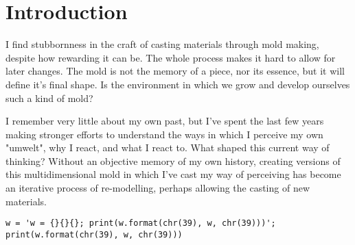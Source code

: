 
\chapter*{Introduction}



I find stubbornness in the craft of casting materials through mold making, despite how rewarding it can be. The whole process makes it hard to allow for later changes. The mold is not the memory of a piece, nor its essence, but it will define it's final shape. Is the environment in which we grow and develop ourselves such a kind of mold? 

I remember very little about my own past, but I’ve spent the last few years making stronger efforts to understand the ways in which I perceive my own "umwelt", why I react, and what I react to. What shaped this current way of thinking? Without an objective memory of my own history, creating versions of this multidimensional mold in which I’ve cast my way of perceiving has become an iterative process of re-modelling, perhaps allowing the casting of new materials.


\footnotesize \begin{verbatim}
w = 'w = {}{}{}; print(w.format(chr(39), w, chr(39)))'; print(w.format(chr(39), w, chr(39)))
\end{verbatim} \normalsize



